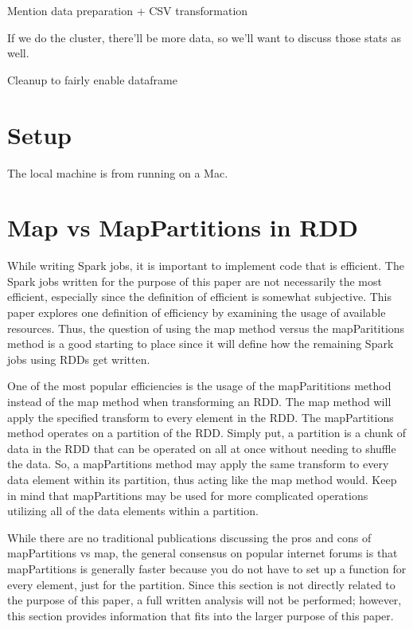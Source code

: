 \documentclass[conference]{IEEEtran}
\begin{document}
Mention data preparation + CSV transformation

If we do the cluster, there'll be more data, so we'll want to discuss those stats as well.

Cleanup to fairly enable dataframe


\section{Setup}
The local machine is from running on a Mac.

\section{Map vs MapPartitions in RDD}
While writing Spark jobs, it is important to implement code that is efficient.
The Spark jobs written for the purpose of this paper are not necessarily the most efficient, especially since the definition of efficient is somewhat subjective.
This paper explores one definition of efficiency by examining the usage of available resources.
Thus, the question of using the map method versus the mapParititions method is a good starting to place since it will define how the remaining Spark jobs using RDDs get written.

One of the most popular efficiencies is the usage of the mapParititions method instead of the map method when transforming an RDD.
The map method will apply the specified transform to every element in the RDD.
The mapPartitions method operates on a partition of the RDD.
Simply put, a partition is a chunk of data in the RDD that can be operated on all at once without needing to shuffle the data.
So, a mapPartitions method may apply the same transform to every data element within its partition, thus acting like the map method would.
Keep in mind that mapPartitions may be used for more complicated operations utilizing all of the data elements within a partition.

While there are no traditional publications discussing the pros and cons of mapPartitions vs map, the general consensus on popular internet forums is that mapPartitions is generally faster because you do not have to set up a function for every element, just for the partition.
Since this section is not directly related to the purpose of this paper, a full written analysis will not be performed; however, this section provides information that fits into the larger purpose of this paper.
\end{document}
